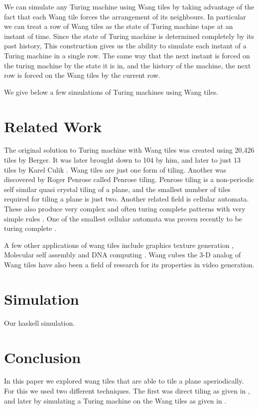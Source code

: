 \documentclass{article}
\begin{document}
We can simulate any Turing machine using Wang tiles by taking advantage of the fact that each Wang tile forces the arrangement of its neighbours. In particular we can treat a row of Wang tiles as the state of Turing machine tape at an instant of time. Since the state of Turing machine is determined completely by its past history, This construction gives us the ability to simulate each instant of a Turing machine in a single row. The same way that the next instant is forced on the turing machine by the state it is in, and the history of the machine, the next row is forced on the Wang tiles by the current row.

We give below a few simulations of Turing machines using Wang tiles.


\section*{Related Work}
The original solution to Turing machine with Wang tiles was created using 20,426 tiles by Berger. It was later brought down to 104 by him, and later to just 13 tiles by Karel Culik \cite{culik}. Wang tiles are just one form of tiling. Another was discovered by Roger Penrose called Penrose tiling. Penrose tiling \cite{penrose} is a non-periodic self similar quasi crystal tiling of a plane, and the smallest number of tiles required for tiling a plane is just two. Another related field is cellular automata. These also produce very complex and often turing complete patterns with very simple rules \cite{wolfram}. One of the smallest cellular automata was proven recently to be turing complete \cite{cook}.

A few other applications of wang tiles include graphics texture generation \cite{texture}, Molecular self assembly \cite{assembly} and DNA computing \cite{dna}. Wang cubes \cite{cubes} the 3-D analog of Wang tiles have also been a field of research for its properties in video generation.

\section*{Simulation}
Our haskell simulation.

\section*{Conclusion}
In this paper we explored wang tiles that are able to tile a plane aperiodically. For this we used two different techniques. The first was direct tiling as given in \cite{tilings}, and later by simulating a Turing machine on the Wang tiles as given in \cite{tmtiles}.

\end{document}
